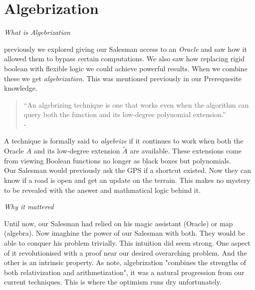 \documentclass[12pt]{report}
\begin{document}
\section*{Algebrization}
\begin{center}
    {\Large\itshape What is Algebrization\par}
\end{center}
previously we explored giving our Salesman access to an \textit{Oracle} and saw how it allowed them to bypass certain computations.
We also saw how replacing rigid boolean with flexible logic we could achieve powerful results.
When we combine these we get \textit{algebrization}.
This was mentioned previously in our Prerequesite knowledge.

\begin{quote}
    “An algebrizing technique is one that works even when the algorithm can query both the function and its low-degree polynomial extension.”\\
    - \cite{arora2008algebrization}
\end{quote}
A technique is formally said to \textit{algebrize} if it continues to work when both the Oracle $A$ and its low-degree extension $\tilde{A}$ are available.
These extensions come from viewing Boolean functions no longer as black boxes but polynomials.\\ 
Our Salesman would previously ask the GPS if a shortcut existed.
Now they can know if a road is open and get an update on the terrain.
This makes no mystery to be revealed with the answer and mathmatical logic behind it.

\begin{center}
    {\Large\itshape Why it mattered\par}
\end{center}
Until now, our Salesman had relied on his magic assistant (Oracle) or map (algebra).
Now imaghine the power of our Salesman with both.
They would be able to conquer his problem trivially.
This intuition did seem strong.
One aspect of it revolutionised with a proof near our desired overarching problem.
And the other is an intrinsic property.
As \cite{arora2009} note, algebrization "combines the strengths of both relativization and arithmetization", it was a natural progression from our current techniques.
This is where the optimism runs dry unfortunately.
\end{document}
